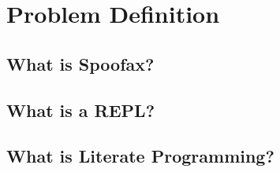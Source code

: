 \section{Problem Definition}
\label{sec:problem-definition}

\subsection{What is Spoofax?}
\label{ssec:spoofax}

\subsection{What is a REPL?}
\label{ssec:repl}

\subsection{What is Literate Programming?}
\label{ssec:literate-programming}

